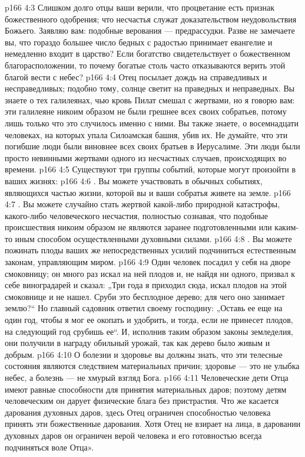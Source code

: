\vs p166 4:3 Слишком долго отцы ваши верили, что процветание есть признак божественного одобрения; что несчастья служат доказательством неудовольствия Божьего. Заявляю вам: подобные верования --- предрассудки. Разве не замечаете вы, что гораздо большее число бедных с радостью принимает евангелие и немедленно входит в царство? Если богатство свидетельствует о божественном благорасположении, то почему богатые столь часто отказываются верить этой благой вести с небес?
\vs p166 4:4 Отец посылает дождь на справедливых и несправедливых; подобно тому, солнце светит на праведных и неправедных. Вы знаете о тех галилеянах, чью кровь Пилат смешал с жертвами, но я говорю вам: эти галилеяне никоим образом не были грешнее всех своих собратьев, потому лишь только что это случилось именно с ними. Вы также знаете, о восемнадцати человеках, на которых упала Силоамская башня, убив их. Не думайте, что эти погибшие люди были виновнее всех своих братьев в Иерусалиме. Эти люди были просто невинными жертвами одного из несчастных случаев, происходящих во времени.
\vs p166 4:5 Существуют три группы событий, которые могут произойти в ваших жизнях:
\vs p166 4:6 . Вы можете участвовать в обычных событиях, являющихся частью жизни, которой вы и ваши собратья живете на земле.
\vs p166 4:7 . Вы можете случайно стать жертвой какой\hyp{}либо природной катастрофы, какого\hyp{}либо человеческого несчастия, полностью сознавая, что подобные происшествия никоим образом не являются заранее подготовленными или каким\hyp{}то иным способом осуществленными духовными силами.
\vs p166 4:8 . Вы можете пожинать плоды ваших же непосредственных усилий подчиниться естественным законам, управляющим миром.
\vs p166 4:9 \pc Один человек посадил у себя на дворе смоковницу; он много раз искал на ней плодов и, не найдя ни одного, призвал к себе виноградарей и сказал: „Три года я приходил сюда, искал плодов на этой смоковнице и не нашел. Сруби это бесплодное дерево; для чего оно занимает землю?“ Но главный садовник ответил своему господину: „Оставь ее еще на один год, чтобы я мог ее окопать и удобрить, и тогда, если не принесет плодов, на следующий год срубишь ее“. И, исполнив таким образом законы земледелия, они получили в награду обильный урожай, так как дерево было живым и добрым.
\vs p166 4:10 О болезни и здоровье вы должны знать, что эти телесные состояния являются следствием материальных причин; здоровье --- это не улыбка небес, а болезнь --- не хмурый взгляд Бога.
\vs p166 4:11 Человеческие дети Отца имеют равные способности для принятия материальных даров; поэтому детям человеческим он дарует физические блага без пристрастия. Что же касается дарования духовных даров, здесь Отец ограничен способностью человека принять эти божественные дарования. Хотя Отец не взирает на лица, в даровании духовных даров он ограничен верой человека и его готовностью всегда подчиняться воле Отца».
